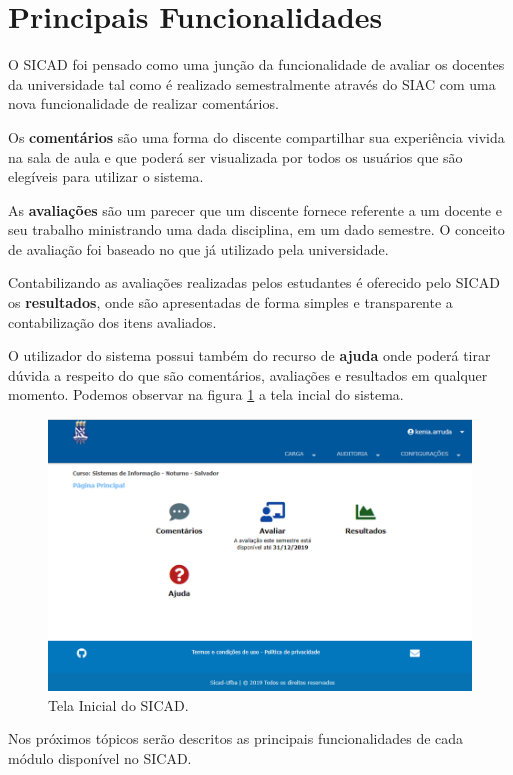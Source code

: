 \documentclass[12pt, a4paper]{report}
\begin{document}
\section{ Principais Funcionalidades}

O \ac{SICAD} foi pensado como uma junção da funcionalidade de avaliar os docentes da universidade tal como é realizado semestralmente através do \ac{SIAC} com uma nova funcionalidade de realizar comentários.

Os \textbf{comentários} são uma forma do discente compartilhar sua experiência vivida na sala de aula e que poderá ser visualizada por todos os usuários que são elegíveis para utilizar o sistema.

As \textbf{avaliações} são um parecer que um discente fornece referente a um docente e seu trabalho ministrando uma dada disciplina, em um dado semestre. O conceito de avaliação foi baseado no que já utilizado pela universidade.

Contabilizando as avaliações realizadas pelos estudantes é oferecido pelo \ac{SICAD} os \textbf{resultados}, onde são apresentadas de forma simples e transparente a contabilização dos itens avaliados.

O utilizador do sistema possui também do recurso de \textbf{ajuda} onde poderá tirar dúvida a respeito do que são comentários, avaliações e resultados em qualquer momento. Podemos observar na figura \ref{fig:home_administrador} a tela incial do sistema.
\begin{figure}
\centering
\includegraphics[scale=0.5]{home_administrador.png}
\caption{Tela Inicial do SICAD.}
\label{fig:home_administrador}
\end{figure}

Nos próximos tópicos serão descritos as principais funcionalidades de cada módulo disponível no \ac{SICAD}.
\end{document}
